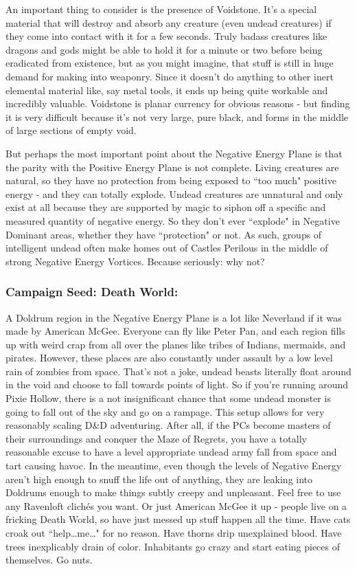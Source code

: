 An important thing to consider is the presence of Voidstone. It's a special material that will destroy and absorb any creature (even undead creatures) if they come into contact with it for a few seconds. Truly badass creatures like dragons and gods might be able to hold it for a minute or two before being eradicated from existence, but as you might imagine, that stuff is still in huge demand for making into weaponry. Since it doesn't do anything to other inert elemental material like, say metal tools, it ends up being quite workable and incredibly valuable. Voidstone is planar currency for obvious reasons - but finding it is very difficult because it's not very large, pure black, and forms in the middle of large sections of empty void.

But perhaps the most important point about the Negative Energy Plane is that the parity with the Positive Energy Plane is not complete. Living creatures are natural, so they have no protection from being exposed to ``too much" positive energy - and they can totally explode. Undead creatures are unnatural and only exist at all because they are supported by magic to siphon off a specific and measured quantity of negative energy. So they don't ever ``explode" in Negative Dominant areas, whether they have ``protection" or not. As such, groups of intelligent undead often make homes out of Castles Perilous in the middle of strong Negative Energy Vortices. Because seriously: why not?

\subsubsection{Campaign Seed: Death World:} A Doldrum region in the Negative Energy Plane is a lot like Neverland if it was made by American McGee. Everyone can fly like Peter Pan, and each region fills up with weird crap from all over the planes like tribes of Indians, mermaids, and pirates. However, these places are also constantly under assault by a low level rain of zombies from space. That's not a joke, undead beasts literally float around in the void and choose to fall towards points of light. So if you're running around Pixie Hollow, there is a not insignificant chance that some undead monster is going to fall out of the sky and go on a rampage. This setup allows for very reasonably scaling D\&D adventuring. After all, if the PCs become masters of their surroundings and conquer the Maze of Regrets, you have a totally reasonable excuse to have a level appropriate undead army fall from space and tart causing havoc. In the meantime, even though the levels of Negative Energy aren't high enough to snuff the life out of anything, they are leaking into Doldrums enough to make things subtly creepy and unpleasant. Feel free to use any Ravenloft clichés you want. Or just American McGee it up - people live on a fricking Death World, so have just messed up stuff happen all the time. Have cats croak out ``help\ldots me\ldots" for no reason. Have thorns drip unexplained blood. Have trees inexplicably drain of color. Inhabitants go crazy and start eating pieces of themselves. Go nuts.

